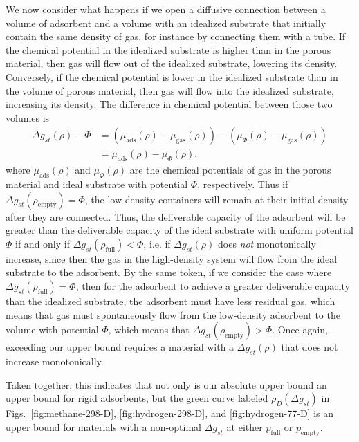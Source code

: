 \documentclass[twoside,twocolumn,9pt]{article}
\newcommand\V{\Phi}
\newcommand\pfull{\ensuremath{p_{\text{full}}}}
\newcommand\pempty{\ensuremath{p_{\text{empty}}}}
\newcommand\rhofull{\ensuremath{\rho_{\text{full}}}}
\newcommand\rhoempty{\ensuremath{\rho_{\text{empty}}}}
\newcommand\gst{\ensuremath{\Delta g_{st}}}
\begin{document}
We now consider what happens if we open a diffusive connection between a
volume of adsorbent and a volume with an idealized substrate that initially contain
the same density of gas, for instance by connecting them with a tube. If the
chemical potential in the idealized substrate is higher than in the porous material,
then gas will flow out of the idealized substrate, lowering its density.  Conversely,
if the chemical potential is lower in the idealized substrate than in the
volume of porous material, then gas will flow into the idealized substrate, increasing
its density.
The difference in chemical potential between those two volumes is
\begin{align}
   \gst(\rho) - \V &= \left(\mu_{\text{ads}}(\rho) - \mu_{\text{gas}}(\rho)\right)
   - \left(\mu_{\V}(\rho) - \mu_{\text{gas}}(\rho)\right)
   \\
   &= \mu_{\text{ads}}(\rho) - \mu_{\V}(\rho).
\end{align}
where $\mu_{\text{ads}}(\rho)$ and $\mu_{\V}(\rho)$ are the chemical potentials
of gas in the porous material and ideal substrate with potential $\V$, respectively.
Thus if $\gst(\rhoempty) =
\V$, the low-density containers will remain at their initial density after
they are connected. Thus, the deliverable capacity of the adsorbent will be greater
than the deliverable capacity of the ideal substrate with uniform potential $\V$ if and
only if $\gst(\rhofull)<\V$, i.e. if $\gst(\rho)$ does \emph{not} monotonically
increase, since then the gas in the high-density system will flow from the ideal
substrate to the adsorbent. By the same token, if we consider the case where
$\gst(\rhofull) = \V$, then for the adsorbent to achieve a greater deliverable
capacity than the idealized substrate, the adsorbent must have less residual gas,
which means that gas must spontaneously flow from the low-density adsorbent to the
volume with potential $\V$, which means that $\gst(\rhoempty)>\V$. Once again,
exceeding our upper bound requires a material with a $\gst(\rho)$ that does not
increase monotonically.

Taken together, this indicates that not only is our absolute upper bound an
upper bound for rigid adsorbents, but the green curve labeled $\rho_D(\gst)$ in
Figs.~\ref{fig:methane-298-D}, \ref{fig:hydrogen-298-D}, and
\ref{fig:hydrogen-77-D} is an upper bound for materials with a non-optimal
$\gst$ at either $\pfull$ or $\pempty$.

\end{document}

